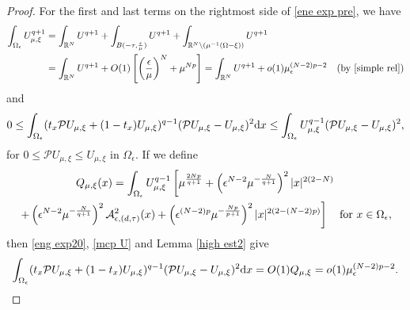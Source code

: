 \documentclass[reqno]{amsart}
\theoremstyle{remark}
\newcommand{\ep}{\epsilon}
\newcommand{\R}{\mathbb{R}}
\newcommand{\mca}{\mathcal{A}}
\newcommand{\mcp}{\mathcal{P}}
\newcommand{\dx}{\textup{d}x}
\newcommand{\mx}{{\mu,\xi}}
\renewcommand{\(}{\left(}
\renewcommand{\)}{\right)}
\numberwithin{equation}{section}
\begin{document}
\begin{proof}
For the first and last terms on the rightmost side of \eqref{ene exp pre}, we have
\begin{equation}\label{eng exp1}
\begin{aligned}
\int_{\Omega_\ep} U_\mx^{q+1} &= \int_{\R^N}U^{q+1} + \int_{B(-\tau,\frac{\ep}{\mu})}U^{q+1} + \int_{\R^N\setminus \(\mu^{-1}(\Omega-\xi)\)}U^{q+1} \\
&= \int_{\R^N}U^{q+1} + O(1)\left[\(\frac{\ep}{\mu}\)^N + \mu^{Np}\right] = \int_{\R^N}U^{q+1} + o(1)\mu_\ep^{(N-2)p-2} \quad \text{(by \eqref{simple rel})}
\end{aligned}
\end{equation}
and
\begin{equation}\label{eng exp20}
0\le \int_{\Omega_\ep} (t_x\mcp U_\mx+(1-t_x)U_\mx)^{q-1}(\mcp U_\mx-U_\mx)^2 \dx \le \int_{\Omega_\ep}U_\mx^{q-1}(\mcp U_\mx-U_\mx)^2,
\end{equation}
for $0 \le \mcp U_\mx \le U_\mx$ in $\Omega_\ep$. If we define
\begin{multline}\label{Q mu}
Q_\mx(x) = \int_{\Omega_\ep}U_\mx^{q-1} \left[\mu^{\frac{2Np}{q+1}} + \(\ep^{N-2}\mu^{-\frac{N}{q+1}}\)^2 {|x|^{2(2-N)}} \right. \\
\left. + \(\ep^{N-2}\mu^{-\frac{N}{q+1}}\)^2 \mca_{\ep,(d,\tau)}^2(x) + \(\ep^{(N-2)p}\mu^{-\frac{Np}{p+1}}\)^2 |x|^{2(2-(N-2)p)}\right] \quad \textup{for } x \in \Omega_\ep,
\end{multline}
then \eqref{eng exp20}, \eqref{mcp U} and Lemma \ref{high est2} give
\begin{equation}\label{eng exp2}
\int_{\Omega_\ep} (t_x\mcp U_\mx+(1-t_x)U_\mx)^{q-1}(\mcp U_\mx-U_\mx)^2 \dx = O(1)Q_\mx =o(1)\mu_\ep^{(N-2)p-2}.
\end{equation}


\end{proof}
\end{document}

